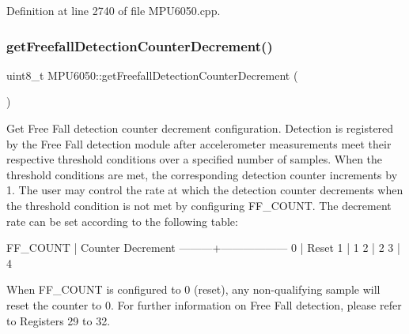 Definition at line 2740 of file M\+P\+U6050.\+cpp.


\begin{DoxyCode}{0}

\end{DoxyCode}
\mbox{\label{classMPU6050_af6d6fa9869636989a8b29c4827ad7de8}} 
\subsubsection{\texorpdfstring{getFreefallDetectionCounterDecrement()}{getFreefallDetectionCounterDecrement()}}
{\footnotesize\ttfamily uint8\+\_\+t M\+P\+U6050\+::get\+Freefall\+Detection\+Counter\+Decrement (\begin{DoxyParamCaption}{ }\end{DoxyParamCaption})}

Get Free Fall detection counter decrement configuration. Detection is registered by the Free Fall detection module after accelerometer measurements meet their respective threshold conditions over a specified number of samples. When the threshold conditions are met, the corresponding detection counter increments by 1. The user may control the rate at which the detection counter decrements when the threshold condition is not met by configuring F\+F\+\_\+\+C\+O\+U\+NT. The decrement rate can be set according to the following table\+:


\begin{DoxyPre}
FF\_COUNT | Counter Decrement
---------+------------------
0        | Reset
1        | 1
2        | 2
3        | 4
\end{DoxyPre}


When F\+F\+\_\+\+C\+O\+U\+NT is configured to 0 (reset), any non-\/qualifying sample will reset the counter to 0. For further information on Free Fall detection, please refer to Registers 29 to 32.

